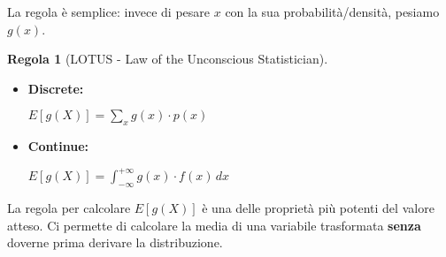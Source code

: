 \documentclass[a4paper, 11pt]{article}
\theoremstyle{definition}
\newtheorem{regola}{Regola}[section]
\begin{document}
La regola è semplice: invece di pesare $x$ con la sua probabilità/densità, pesiamo $g(x)$.

\begin{regola}[LOTUS - Law of the Unconscious Statistician]
\
\begin{itemize}
    \item \textbf{Discrete:}
    \begin{formulabox}
        $E[g(X)] = \sum_x g(x) \cdot p(x)$
    \end{formulabox}

    \item \textbf{Continue:}
    \begin{formulabox}
        $E[g(X)] = \int_{-\infty}^{+\infty} g(x) \cdot f(x) \, dx$
    \end{formulabox}
\end{itemize}
\end{regola}
\begin{tcolorbox}[colback=green!5!white, colframe=green!60!black, title=Importanza di LOTUS]
La regola per calcolare $E[g(X)]$ è una delle proprietà più potenti del valore atteso. Ci permette di calcolare la media di una variabile trasformata \textbf{senza} doverne prima derivare la distribuzione.
\end{tcolorbox}
\end{document}
